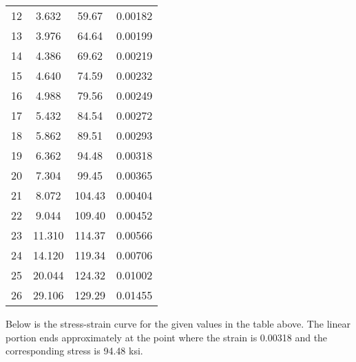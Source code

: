 \documentclass{article}
\begin{document}
\begin{center}
\begin{tabular}{|cccc|}
            12                   & 3.632                           & 59.67                 & 0.00182          \\
            13                   & 3.976                           & 64.64                 & 0.00199          \\
            14                   & 4.386                           & 69.62                 & 0.00219          \\
            15                   & 4.640                           & 74.59                 & 0.00232          \\
            16                   & 4.988                           & 79.56                 & 0.00249          \\
            17                   & 5.432                           & 84.54                 & 0.00272          \\
            18                   & 5.862                           & 89.51                 & 0.00293          \\
            19                   & 6.362                           & 94.48                 & 0.00318          \\
            20                   & 7.304                           & 99.45                 & 0.00365          \\
            21                   & 8.072                           & 104.43                & 0.00404          \\
            22                   & 9.044                           & 109.40                & 0.00452          \\
            23                   & 11.310                          & 114.37                & 0.00566          \\
            24                   & 14.120                          & 119.34                & 0.00706          \\
            25                   & 20.044                          & 124.32                & 0.01002          \\
            26                   & 29.106                          & 129.29                & 0.01455          \\
            \hline
        \end{tabular}
    \end{center}
    \newpage
    \noindent Below is the stress-strain curve for the given values in the table above. The linear portion ends approximately at the point where the strain is 0.00318 and the corresponding stress is 94.48 ksi.
\end{document}
